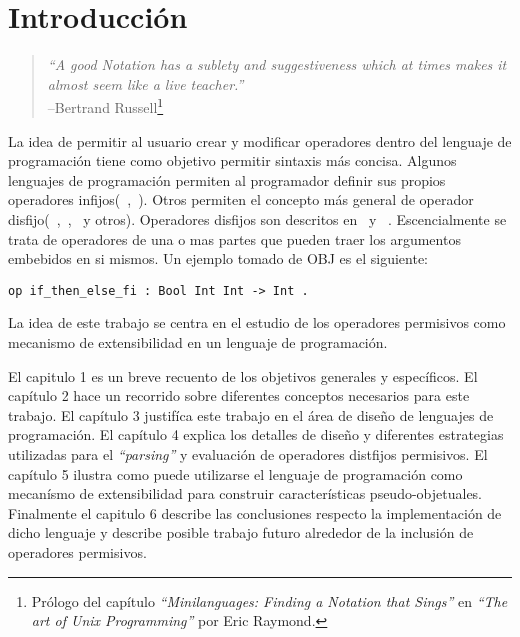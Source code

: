 \chapter{Introducción}

\begin{quote} \textit{``A good Notation has a sublety and suggestiveness which at
  times makes it almost seem like a live teacher.''}
  \\ --Bertrand Russell\footnote{Prólogo del capítulo \textit{``Minilanguages: Finding a
    Notation that Sings''} en \textit{``The art of Unix Programming''} por Eric Raymond.}
\end{quote} 

La idea de permitir al usuario crear y modificar operadores dentro del lenguaje de
programación tiene como objetivo permitir sintaxis más concisa. Algunos lenguajes de
programación permiten al programador definir sus propios operadores
infijos(~\cite{jones:haskell},~\cite{leroy:ocaml}). Otros permiten el concepto más
general de operador disfijo(~\cite{Coq},~\cite{goguen:obj},~\cite{clavel:maude} y
otros). Operadores disfijos son descritos en~\cite{jones:distfix} y
~\cite{Aasa:UDS}. Escencialmente se trata de operadores de una o mas partes que
pueden traer los argumentos embebidos en si mismos. Un ejemplo tomado de OBJ es el 
siguiente:

\begin{verbatim}
op if_then_else_fi : Bool Int Int -> Int .
\end{verbatim}

La idea de este trabajo se centra en el estudio de los operadores permisivos 
como mecanismo de extensibilidad en un lenguaje de programación. 

El capitulo 1 es un breve recuento de los objetivos generales y específicos. El
capítulo 2 hace un recorrido sobre diferentes conceptos necesarios para este
trabajo. El capítulo 3 justifíca este trabajo en el área de diseño de lenguajes de
programación. El capítulo 4 explica los detalles de diseño y diferentes estrategias
utilizadas para el \textit{``parsing''} y evaluación de operadores distfijos
permisivos. El capítulo 5 ilustra como puede utilizarse el lenguaje de programación
como mecanísmo de extensibilidad para construir características
pseudo-objetuales. Finalmente el capitulo 6 describe las conclusiones respecto la
implementación de dicho lenguaje y describe posible trabajo futuro alrededor de la
inclusión de operadores permisivos.












  


